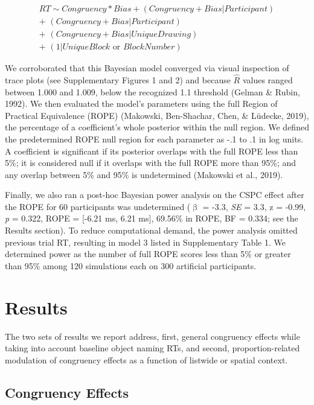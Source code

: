 \documentclass[
  ,man,floatsintext]{apa6}
\begin{document}
\[\begin{aligned}RT \sim Congruency * Bias + (Congruency + Bias | Participant)\\\text{+ } (Congruency + Bias | Participant)\\\text{+ } (Congruency + Bias | Unique Drawing)\\\text{+ } (1 | Unique Block \text{ or } Block Number)\end{aligned}\]

We corroborated that this Bayesian model converged via visual inspection of trace plots (see Supplementary Figures 1 and 2) and because \(\widehat{R}\) values ranged between 1.000 and 1.009, below the recognized 1.1 threshold (Gelman \& Rubin, 1992). We then evaluated the model's parameters using the full Region of Practical Equivalence (ROPE) (Makowski, Ben-Shachar, Chen, \& Lüdecke, 2019), the percentage of a coefficient's whole posterior within the null region. We defined the predetermined ROPE null region for each parameter as -.1 to .1 in log units. A coefficient is significant if its posterior overlaps with the full ROPE less than 5\%; it is considered null if it overlaps with the full ROPE more than 95\%; and any overlap between 5\% and 95\% is undetermined (Makowski et al., 2019).

Finally, we also ran a post-hoc Bayesian power analysis on the CSPC effect after the ROPE for 60 participants was undetermined (\(\upbeta\) = -3.3, \emph{SE} = 3.3, z = -0.99, \emph{p} = 0.322, ROPE = {[}-6.21 ms, 6.21 ms{]}, 69.56\% in ROPE, BF = 0.334; see the Results section). To reduce computational demand, the power analysis omitted previous trial RT, resulting in model 3 listed in Supplementary Table 1. We determined power as the number of full ROPE scores less than 5\% or greater than 95\% among 120 simulations each on 300 artificial participants.

\hypertarget{results}{%
\section{Results}\label{results}}

The two sets of results we report address, first, general congruency effects while taking into account baseline object naming RTs, and second, proportion-related modulation of congruency effects as a function of listwide or spatial context.

\hypertarget{congruency-effects}{%
\subsection{Congruency Effects}\label{congruency-effects}}
\end{document}

